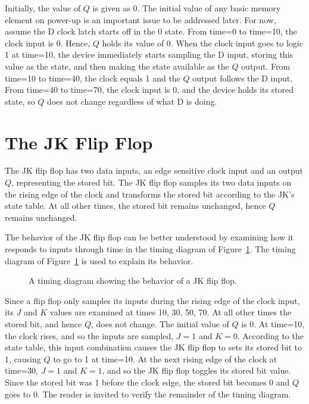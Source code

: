 Initially, the value of $Q$ is given as 0.  The initial value
of any basic memory element on power-up is an important issue 
to be addressed later. For now, assume the
D clock latch starts off in the 0 state.  From time=0 to time=10, the 
clock input is 0. Hence, $Q$ holds its value of 0.  When the 
clock input goes to logic 1 at time=10, the device immediately
starts sampling the D input, storing this value as the state, 
and then making the state available as the $Q$ output.  From
time=10 to time=40, the clock equals 1 and the $Q$ output follows 
the D input.  From time=40 to time=70, the clock input is 0, and
the device holds its stored state, so $Q$ does not change
regardless of what D is doing.

\section{The JK Flip Flop}
The JK flip flop has two data inputs, an edge sensitive clock 
input and an output $Q$, representing the stored bit.  The 
JK flip flop samples its two data inputs on the rising edge 
of the clock and transforms the stored bit according to the 
JK's state table.  At all other times, the stored bit remains
unchanged, hence $Q$ remains unchanged.

The behavior of the JK flip flop can be better understood
by examining how it responds to inputs through time in the 
timing diagram of Figure~\ref{fig:sequentialCirJKFF}.  
The timing diagram of Figure~\ref{fig:sequentialCirJKFF}
is used to explain its behavior.
\begin{figure}[ht]
\caption{A timing diagram showing the behavior of a JK flip flop.}
\label{fig:sequentialCirJKFF}
\end{figure}

Since a flip flop only samples its inputs during the rising edge 
of the clock input, its $J$ and $K$ values are examined 
at times 10, 30, 50, 70. At all other times the stored bit, and 
hence $Q$, does not change. The initial value of $Q$ is 0.  At 
time=10, the clock rises, and so the inputs are sampled, $J=1$ and
$K=0$.  According to the state table, this input combination causes
the JK flip flop to sets its stored bit to 1, causing $Q$ to go
to 1 at time=10.  At the next rising edge of the clock at time=30, 
$J=1$ and $K=1$, and so the JK flip flop toggles its stored bit value.  
Since the stored bit was 1 before the clock edge, the stored bit
becomes 0 and $Q$ goes to 0.  The reader is invited to verify the
remainder of the timing diagram.

